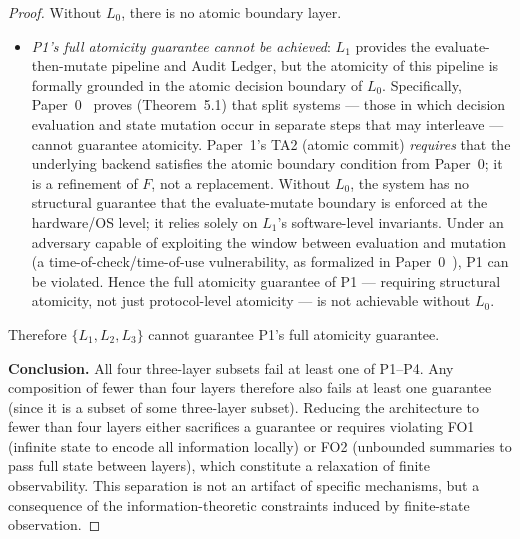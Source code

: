 \documentclass[11pt]{article}
\newcommand{\Layer}[1]{L_{#1}}
\begin{document}
\begin{proof}
Without $\Layer{0}$, there is no atomic boundary layer.
\begin{itemize}[noitemsep]
  \item \emph{P1's full atomicity guarantee cannot be achieved}: $\Layer{1}$
    provides the evaluate-then-mutate pipeline and Audit Ledger, but the
    atomicity of this pipeline is formally grounded in the atomic decision
    boundary of $\Layer{0}$. Specifically, Paper~0~\cite{fernandez2026a}
    proves (Theorem~5.1) that split systems --- those in which decision
    evaluation and state mutation occur in separate steps that may interleave
    --- cannot guarantee atomicity. Paper~1's TA2 (atomic commit)
    \emph{requires} that the underlying backend satisfies the atomic boundary
    condition from Paper~0; it is a refinement of $F$, not a replacement.
    Without $\Layer{0}$, the system has no structural guarantee that the
    evaluate-mutate boundary is enforced at the hardware/OS level; it relies
    solely on $\Layer{1}$'s software-level invariants. Under an adversary
    capable of exploiting the window between evaluation and mutation
    (a time-of-check/time-of-use vulnerability, as formalized in
    Paper~0~\cite{fernandez2026a}), P1 can be violated. Hence the full
    atomicity guarantee of P1 --- requiring structural atomicity, not just
    protocol-level atomicity --- is not achievable without $\Layer{0}$.
\end{itemize}
Therefore $\{\Layer{1},\Layer{2},\Layer{3}\}$ cannot guarantee P1's full
atomicity guarantee.

\medskip
\noindent\textbf{Conclusion.}
All four three-layer subsets fail at least one of P1--P4. Any composition of
fewer than four layers therefore also fails at least one guarantee (since it
is a subset of some three-layer subset). Reducing the architecture to fewer
than four layers either sacrifices a guarantee or requires violating FO1
(infinite state to encode all information locally) or FO2 (unbounded summaries
to pass full state between layers), which constitute a relaxation of finite
observability. This separation is not an artifact of specific mechanisms, but
a consequence of the information-theoretic constraints induced by finite-state
observation.
\end{proof}
\end{document}
